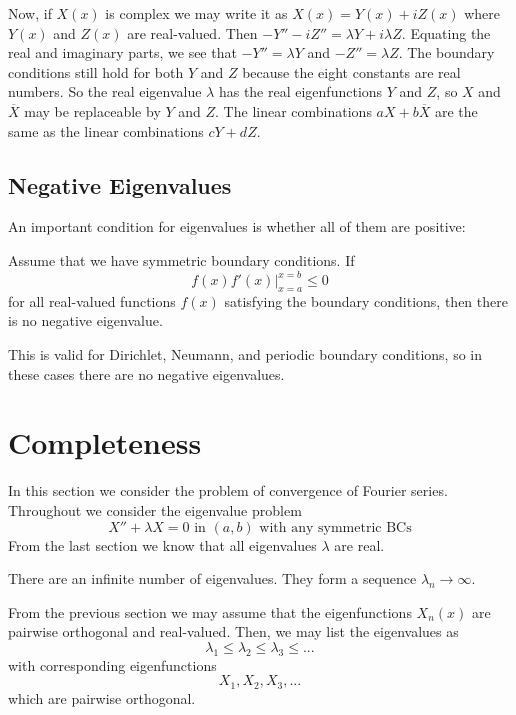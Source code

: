 \documentclass[12pt, a4paper, oneside, openright, titlepage]{book}
\begin{document}
Now, if $X(x)$ is complex we may write it as $X(x) = Y(x) + iZ(x)$ where $Y(x)$ and $Z(x)$ are real-valued. Then $-Y''-iZ'' = \lambda Y+i\lambda Z$. Equating the real and imaginary parts, we see that $-Y'' = \lambda Y$ and $-Z'' = \lambda Z$. The boundary conditions still hold for both $Y$ and $Z$ because the eight constants are real numbers. So the real eigenvalue $\lambda$ has the real eigenfunctions $Y$ and $Z$, so $X$ and $\overline{X}$ may be replaceable by $Y$ and $Z$. The linear combinations $aX+b\overline{X}$ are the same as the linear combinations $cY+dZ$.

\subsection{Negative Eigenvalues}

An important condition for eigenvalues is whether all of them are positive:
 
\begin{thm}
    Assume that we have symmetric boundary conditions. If \begin{equation*}
        f(x)f'(x)\Bigg\rvert_{x=a}^{x=b}\leq 0
    \end{equation*}
    for all real-valued functions $f(x)$ satisfying the boundary conditions, then there is no negative eigenvalue.
\end{thm}

This is valid for Dirichlet, Neumann, and periodic boundary conditions, so in these cases there are no negative eigenvalues.



\section{Completeness}

In this section we consider the problem of convergence of Fourier series. Throughout we consider the eigenvalue problem \begin{equation*}
    X'' + \lambda X=0\text{ in } (a,b)\text{ with any symmetric BCs}
\end{equation*}
From the last section we know that all eigenvalues $\lambda$ are real.

\begin{thm}
    There are an infinite number of eigenvalues. They form a sequence $\lambda_n\rightarrow \infty$.
\end{thm}
From the previous section we may assume that the eigenfunctions $X_n(x)$ are pairwise orthogonal and real-valued. Then, we may list the eigenvalues as $$\lambda_1\leq\lambda_2\leq\lambda_3\leq ...$$ with corresponding eigenfunctions $$X_1,X_2,X_3,...$$ which are pairwise orthogonal.
\end{document}
